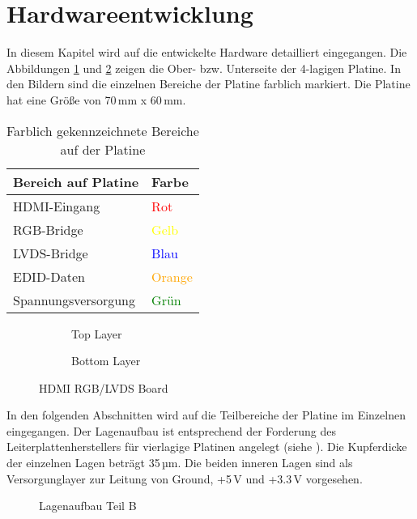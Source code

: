 \section{Hardwareentwicklung}
\label{sec:TeilB_Hardware}
In diesem Kapitel wird auf die entwickelte Hardware detailliert eingegangen. Die Abbildungen \ref{fig:teilb_pcb_top} und \ref{fig:teilb_pcb_bot} zeigen die Ober- bzw. Unterseite der 4-lagigen Platine. In den Bildern sind die einzelnen Bereiche der Platine farblich markiert. Die Platine hat eine Größe von 70\,mm x 60\,mm.

\begin{table}[h]
\begin{tabular}{|p{8cm}|p{5.5cm}|}\hline
\rowcolor{TableBackgroundColor} 
   \textbf{Bereich auf Platine} & \textbf{Farbe}\\ \hline
  HDMI-Eingang &  \textcolor{red}{Rot} \\ \hline
  RGB-Bridge & \textcolor{yellow}{Gelb} \\ \hline
  LVDS-Bridge & \textcolor{blue}{Blau}  \\ \hline
  EDID-Daten &  \textcolor{orange}{Orange} \\ \hline
  Spannungsversorgung &  \textcolor{green}{Grün} \\ \hline 
\end{tabular}
\caption{Farblich gekennzeichnete Bereiche auf der Platine}
\label{tab:pcb_areas}
\end{table}

\begin{figure}[htbp]
        \centering
        \begin{subfigure}[htp]{0.48\textwidth}
                \caption{Top Layer}
                \label{fig:teilb_pcb_top}
        \end{subfigure}
\quad 
        \begin{subfigure}[htp]{0.48\textwidth}
                             				\caption{Bottom Layer}
                \label{fig:teilb_pcb_bot}
        \end{subfigure}
        \caption{HDMI RGB/LVDS Board}
        \label{fig:teilb_pcb}
\end{figure}

In den folgenden Abschnitten wird auf die Teilbereiche der Platine im Einzelnen eingegangen. Der Lagenaufbau ist entsprechend der Forderung des Leiterplattenherstellers für vierlagige Platinen angelegt (siehe ). Die Kupferdicke der einzelnen Lagen beträgt 35\,µm. Die beiden inneren Lagen sind als Versorgunglayer zur Leitung von Ground, +5\,V und +3.3\,V vorgesehen.
        \begin{figure}[htp]
        	\center
            \caption{Lagenaufbau Teil B}
            \label{fig:teilb_lagenaufbau}
        \end{figure}

